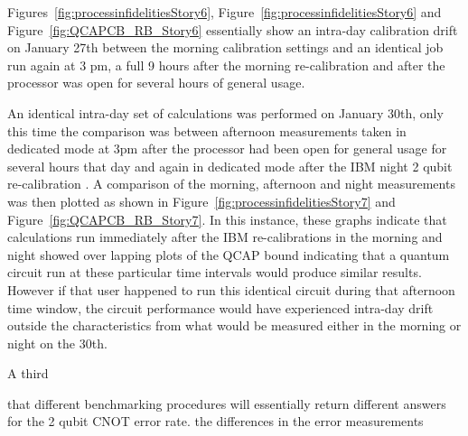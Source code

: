 Figures~\ref{fig:processinfidelitiesStory6}, Figure~\ref{fig:processinfidelitiesStory6} and Figure~\ref{fig:QCAPCB_RB_Story6} essentially show an intra-day calibration drift on January 27th between the morning calibration settings and an identical job run again at 3 pm, a full 9 hours after the morning re-calibration and after the processor was open for several hours of general usage.

An identical intra-day set of calculations was performed on January 30th, only this time the comparison was between afternoon measurements taken in dedicated mode at 3pm after the processor had been open for general usage for several hours that day and again in dedicated mode after the IBM night 2 qubit re-calibration .  A comparison of the morning, afternoon and night measurements was then plotted as shown in  Figure~\ref{fig:processinfidelitiesStory7} and Figure~\ref{fig:QCAPCB_RB_Story7}.  In this instance, these graphs indicate that calculations run immediately after the IBM re-calibrations in the morning and night showed over lapping plots of the QCAP bound indicating that a quantum circuit run at these particular time intervals would produce similar results.  However if that user happened to run this identical circuit during that afternoon time window, the circuit performance would have experienced intra-day drift outside the characteristics from what would be measured either in the morning or night on the 30th.

A third 






that different benchmarking procedures will essentially return different answers for the 2 qubit CNOT error rate.   
the differences in the error measurements   




  
